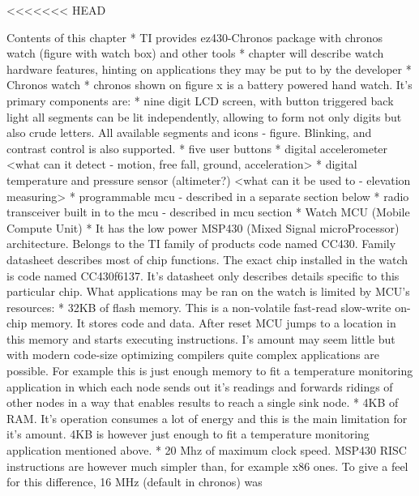 <<<<<<< HEAD
\begin{commnet}
  Contents of this chapter
    * TI provides ez430-Chronos package with chronos watch (figure
    with watch box) and other tools
    * chapter will describe watch hardware features, hinting on
    applications they may be put to by the developer
    * Chronos watch
      * chronos shown on figure x is a battery powered hand watch. It's
        primary components are:
      * nine digit LCD screen, with button triggered back light all segments can
        be lit independently, allowing to form not only digits but also crude
        letters. All available segments and icons - figure. Blinking, and
        contrast control is also supported.
      * five user buttons
      * digital accelerometer
        <what can it detect - motion, free fall, ground, acceleration>
      * digital temperature and pressure sensor (altimeter?)
        <what can it be used to - elevation measuring>
      * programmable mcu - described in a separate section below
      * radio transceiver built in to the mcu - described in mcu section
    * Watch MCU (Mobile Compute Unit)
      * It has the low power MSP430 (Mixed Signal microProcessor) architecture.
        Belongs to the TI family of products code named CC430. Family datasheet
        describes most of chip functions.  The exact chip installed in the
        watch is code named CC430f6137. It's datasheet only describes details
        specific to this particular chip. What applications may be ran on the
        watch is limited by MCU's resources:
        * 32KB of flash memory. This is a non-volatile fast-read slow-write
          on-chip memory. It stores code and data. After reset MCU jumps to a
          location in this memory and starts executing instructions. I's amount
          may seem little but with modern code-size optimizing compilers quite
          complex applications are possible. For example this is just enough
          memory to fit a temperature monitoring application in which each node
          sends out it's readings and forwards ridings of other nodes in a way
          that enables results to reach a single sink node.
        * 4KB of RAM. It's operation consumes a lot of energy and this is the
          main limitation for it's amount. 4KB is however just enough to fit a
          temperature
          monitoring application mentioned above.
        * 20 Mhz of maximum clock speed. MSP430 RISC instructions are
          however much simpler than, for example x86 ones. To give a
          feel for this difference, 16 MHz (default in chronos) was

\end{commnet}
